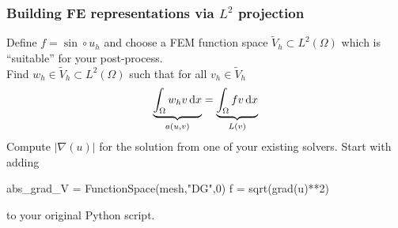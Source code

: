 \begin{frame}[fragile]
    \frametitle{Building FE representations via $L^2$ projection}
    Define $f = \sin \circ u_h$ and choose
    a  FEM function space  $\widetilde{V}_h \subset L^2(\Omega)$ which
    is ``suitable'' for your post-process.
    \\
    \vspace{1em}
    Find $w_h \in \widetilde{V}_h
    \subset L^2(\Omega)$ such that for all $v_h  \in \widetilde{V}_h$
{
    \begin{equation*}
        \underbrace{\int_{\Omega} w_h v \, \mathrm{d}x}_{
        a(u,v)}
        = \underbrace{\int_{\Omega} f v \, \mathrm{d}x}_{L(v)}
    \end{equation*}
}
\noindent{}
 Compute $|\nabla(u)|$ for the solution from one of your existing solvers.
 Start with adding
\vspace{-1em}
 \begin{python}
abs_grad_V = FunctionSpace(mesh,"DG",0)
f = sqrt(grad(u)**2)
 \end{python}
 to your original Python script.
\end{frame}
